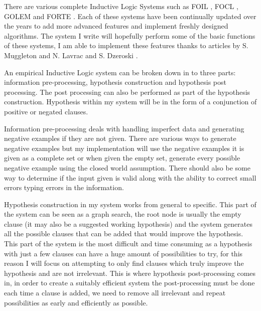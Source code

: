 \documentclass{article}
\begin{document}
There are various complete Inductive Logic Systems such as FOIL \cite{foil},
      FOCL \cite{focl}, GOLEM \cite{golem} and FORTE \cite{golem}. Each of
      these systems have been continually updated over the years to add more
      advanced features and implement freshly designed algorithms. 
The system I write will hopefully perform some of the basic functions of these
systems, I am able to implement these features thanks to articles by S.
Muggleton \cite{mugg} and N. Lavrac and S. Dzeroski \cite{lavdzer}.

An empirical Inductive Logic system can be broken down in to three parts:
information pre-processing, hypothesis construction and hypothesis post
processing. The post processing can also be performed as part of the hypothesis
construction. Hypothesis within my system will be in the form of a conjunction
of positive or negated clauses.

Information pre-processing deals with handling imperfect data and generating
negative examples if they are not given. There are various ways to generate
negative examples but my implementation will use the negative examples it is
given as a complete set or when given the empty set, generate every possible
negative example using the closed world assumption. There should also be some
way to determine if the input given is valid along with the ability to correct
small errors typing errors in the information.

Hypothesis construction in my system works from general to specific. This part
of the system can be seen as a graph search, the root node is usually the empty
clause (it may also be a suggested working hypothesis) and the system generates
all the possible clauses that can be added that would improve the hypothesis.
This part of the system is the most difficult and time consuming as a
hypothesis with just a few clauses can have a huge amount of possibilities to
try, for this reason I will focus on attempting to only find clauses which
truly improve the hypothesis and are not irrelevant. This is where hypothesis
post-processing comes in, in order to create a suitably efficient system the
post-processing must be done each time a clause is added, we need to remove all
irrelevant and repeat possibilities as early and efficiently as possible.
\end{document}
